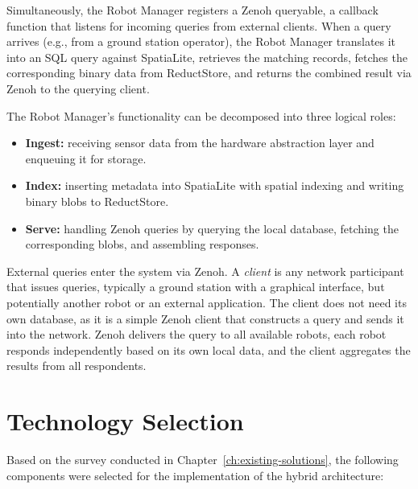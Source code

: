 Simultaneously, the Robot Manager registers a Zenoh queryable, a callback function that listens for incoming queries from external clients. When a query arrives (e.g., from a ground station operator), the Robot Manager translates it into an SQL query against SpatiaLite, retrieves the matching records, fetches the corresponding binary data from ReductStore, and returns the combined result via Zenoh to the querying client.

The Robot Manager's functionality can be decomposed into three logical roles:
\begin{itemize}
    \item \textbf{Ingest:} receiving sensor data from the hardware abstraction layer and enqueuing it for storage.
    \item \textbf{Index:} inserting metadata into SpatiaLite with spatial indexing and writing binary blobs to ReductStore.
    \item \textbf{Serve:} handling Zenoh queries by querying the local database, fetching the corresponding blobs, and assembling responses.
\end{itemize}

External queries enter the system via Zenoh. A \emph{client} is any network participant that issues queries, typically a ground station with a graphical interface, but potentially another robot or an external application. The client does not need its own database, as it is a simple Zenoh client that constructs a query and sends it into the network. Zenoh delivers the query to all available robots, each robot responds independently based on its own local data, and the client aggregates the results from all respondents.


\section{Technology Selection} \label{sec:technology-selection}

Based on the survey conducted in Chapter~\ref{ch:existing-solutions}, the following components were selected for the implementation of the hybrid architecture:

